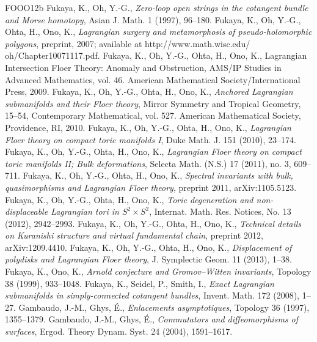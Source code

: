 \begin{thebibliography}{FOOO12b}
 Fukaya, K., Oh, Y.-G., \textit{Zero-loop open strings in the cotangent bundle and Morse homotopy}, Asian J. Math. 1 (1997), 96--180.
 Fukaya, K., Oh, Y.-G., Ohta, H., Ono, K., \textit{Lagrangian surgery and metamorphosis of pseudo-holomorphic polygons}, preprint, 2007; available at http://www.math.wisc.edu/ oh/Chapter10071117.pdf.
 Fukaya, K., Oh, Y.-G., Ohta, H., Ono, K., Lagrangian Intersection Floer Theory: Anomaly and Obstruction, AMS/IP Studies in Advanced Mathematics, vol. 46. American Mathematical Society/International Press, 2009.
 Fukaya, K., Oh, Y.-G., Ohta, H., Ono, K., \textit{Anchored Lagrangian submanifolds and their Floer theory}, Mirror Symmetry and Tropical Geometry, 15--54, Contemporary Mathematical, vol. 527. American Mathematical Society, Providence, RI, 2010.
 Fukaya, K., Oh, Y.-G., Ohta, H., Ono, K., \textit{Lagrangian Floer theory on compact toric manifolds I}, Duke Math. J. 151 (2010), 23--174.
 Fukaya, K., Oh, Y.-G., Ohta, H., Ono, K., \textit{Lagrangian Floer theory on compact toric manifolds II; Bulk deformations}, Selecta Math. (N.S.) 17 (2011), no. 3, 609--711.
 Fukaya, K., Oh, Y.-G., Ohta, H., Ono, K., \textit{Spectral invariants with bulk, quasimorphisms and Lagrangian Floer theory}, preprint 2011, arXiv:1105.5123.
 Fukaya, K., Oh, Y.-G., Ohta, H., Ono, K., \textit{Toric degeneration and non-displaceable Lagrangian tori in $S^2 \times S^2$}, Internat. Math. Res. Notices, No. 13 (2012), 2942--2993.
 Fukaya, K., Oh, Y.-G., Ohta, H., Ono, K., \textit{Technical details on Kuranishi structure and virtual fundamental chain}, preprint 2012, arXiv:1209.4410.
 Fukaya, K., Oh, Y.-G., Ohta, H., Ono, K., \textit{Displacement of polydisks and Lagrangian Floer theory}, J. Symplectic Geom. 11 (2013), 1--38.
 Fukaya, K., Ono, K., \textit{Arnold conjecture and Gromov--Witten invariants}, Topology 38 (1999), 933--1048.
 Fukaya, K., Seidel, P., Smith, I., \textit{Exact Lagrangian submanifolds in simply-connected cotangent bundles}, Invent. Math. 172 (2008), 1--27.
 Gambaudo, J.-M., Ghys, É., \textit{Enlacements asymptotiques}, Topology 36 (1997), 1355--1379.
 Gambaudo, J.-M., Ghys, É., \textit{Commutators and diffeomorphisms of surfaces}, Ergod. Theory Dynam. Syst. 24 (2004), 1591--1617.

\end{thebibliography}

